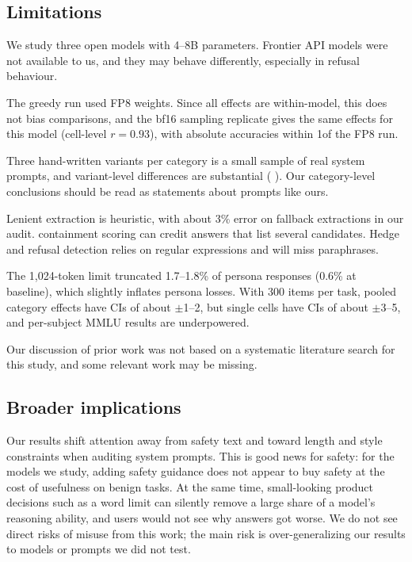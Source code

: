\subsection{Limitations}
\label{sec:limitations}

 We study three open models with 4--8B parameters. Frontier API models were not available to us, and they may behave differently, especially in refusal behaviour.

 The greedy \qwenthree run used FP8 weights. Since all effects are within-model, this does not bias comparisons, and the bf16 sampling replicate gives the same effects for this model (cell-level $r=0.93$), with absolute accuracies within 1\pp of the FP8 run.

 Three hand-written variants per category is a small sample of real system prompts, and variant-level differences are substantial (\eg {} \versus {}). Our category-level conclusions should be read as statements about prompts like ours.

 Lenient extraction is heuristic, with about 3\% error on fallback extractions in our audit. \drop containment scoring can credit answers that list several candidates. Hedge and refusal detection relies on regular expressions and will miss paraphrases.

 The 1,024-token limit truncated 1.7--1.8\% of persona responses (0.6\% at baseline), which slightly inflates persona losses. With 300 items per task, pooled category effects have CIs of about $\pm$1--2\pp, but single cells have CIs of about $\pm$3--5\pp, and per-subject MMLU results are underpowered.

 Our discussion of prior work was not based on a systematic literature search for this study, and some relevant work may be missing.

\subsection{Broader implications}
Our results shift attention away from safety text and toward length and style constraints when auditing system prompts. This is good news for safety: for the models we study, adding safety guidance does not appear to buy safety at the cost of usefulness on benign tasks. At the same time, small-looking product decisions such as a word limit can silently remove a large share of a model's reasoning ability, and users would not see why answers got worse. We do not see direct risks of misuse from this work; the main risk is over-generalizing our results to models or prompts we did not test.
